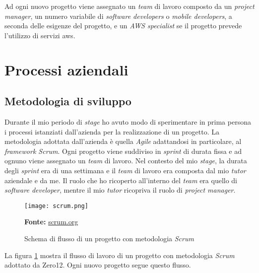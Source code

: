 \noindent
Ad ogni nuovo progetto viene assegnato un \textit{team} di lavoro composto da un \textit{project manager}, un numero variabile di \textit{software developers} o \textit{mobile developers}, a seconda delle esigenze del progetto, e un \textit{AWS specialist} se il progetto prevede l'utilizzo di servizi \gls{aws}. 
\section{Processi aziendali}
\subsection{Metodologia di sviluppo}
Durante il mio periodo di \textit{stage} ho avuto modo di sperimentare in prima persona i processi istanziati dall'azienda per la realizzazione di un progetto.
La metodologia adottata dall'azienda è quella \textit{Agile} adattandosi in particolare, al \textit{framework Scrum}.
Ogni progetto viene suddiviso in \textit{sprint} di durata fissa e ad ognuno viene assegnato un \textit{team} di lavoro.
Nel contesto del mio \textit{stage}, la durata degli \textit{sprint} era di una settimana e il \textit{team} di lavoro era composta dal mio \textit{tutor} aziendale e da me.
Il ruolo che ho ricoperto all'interno del \textit{team} era quello di \textit{software developer}, mentre il mio \textit{tutor} ricopriva il ruolo di \textit{project manager}.
\begin{figure}[H]
    \centering
    \texttt{[image: scrum.png]}
    \caption{Schema di flusso di un progetto con metodologia \textit{Scrum}}
    \small \textbf{Fonte:} \url{scrum.org}
    \label{fig:scrum}
\end{figure}
\noindent
La figura \ref{fig:scrum} mostra il flusso di lavoro di un progetto con metodologia \textit{Scrum} adottato da Zero12. Ogni nuovo progetto segue questo flusso. 
